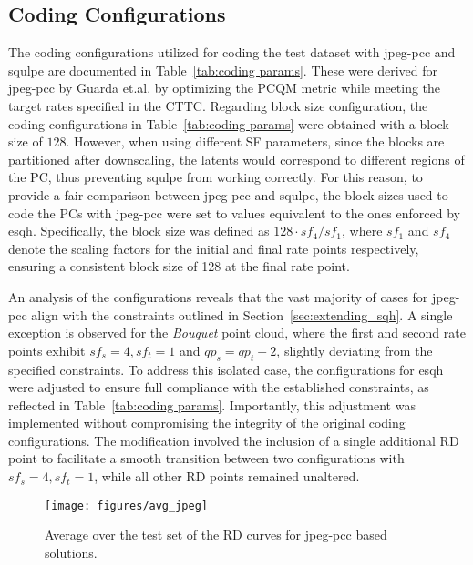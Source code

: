 \subsection{Coding Configurations}
The coding configurations utilized for coding the test dataset with \gls{jpeg-pcc} and \gls{squlpe} are documented in Table~\ref{tab:coding params}. These were derived for \gls{jpeg-pcc} by Guarda et.al. \cite{guarda2024jpeg} by optimizing the PCQM metric \cite{meynet2020pcqm} while meeting the target rates specified in the CTTC.
Regarding block size configuration, the coding configurations in Table~\ref{tab:coding params} were obtained with a block size of $128$. However, when using different SF parameters, since the blocks are partitioned after downscaling, the latents would correspond to different regions of the PC, thus preventing \gls{squlpe} from working correctly. For this reason, to provide a fair comparison between \gls{jpeg-pcc} and \gls{squlpe}, the block sizes used to code the PCs with \gls{jpeg-pcc}
were set to values equivalent to the ones enforced by \gls{esqh}. Specifically, the block size was defined as $128 \cdot sf_4/sf_1$, where $sf_1$ and $sf_4$ denote the scaling factors for the initial and final rate points respectively, ensuring a consistent block size of 128 at the final rate point.

An analysis of the configurations reveals that the vast majority of cases for \gls{jpeg-pcc} align with the constraints outlined in Section~\ref{sec:extending_sqh}. A single exception is observed for the \textit{Bouquet} point cloud, where the first and second rate points exhibit $sf_s=4, sf_t=1$ and $qp_s = qp_t + 2$, slightly deviating from the specified constraints.
To address this isolated case, the configurations for \gls{esqh} were adjusted to ensure full compliance with the established constraints, as reflected in Table~\ref{tab:coding params}. Importantly, this adjustment was implemented without compromising the integrity of the original coding configurations. The modification involved the inclusion of a single additional RD point to facilitate a smooth transition between two configurations with $sf_s=4, sf_t=1$, while all other RD points remained unaltered.


\begin{figure*}
    \centering
    \texttt{[image: figures/avg\_jpeg]}
    \caption{Average over the test set of the RD curves for \gls{jpeg-pcc} based solutions.}
    \label{fig:avg_jpeg}
\end{figure*}


